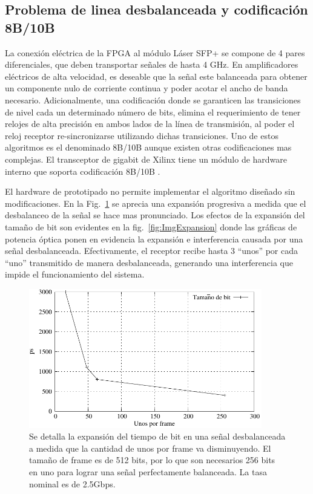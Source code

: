 \subsection{Problema de linea desbalanceada y codificación 8B/10B}
La conexión eléctrica de la FPGA al módulo Láser SFP+ se compone de 4 pares diferenciales, que deben transportar señales de hasta 4 GHz. En amplificadores eléctricos de alta velocidad, es deseable que la señal este balanceada para obtener un componente nulo de corriente continua y poder acotar el ancho de banda necesario. Adicionalmente, una codificación donde se garanticen las transiciones de nivel cada un determinado número de bits, elimina el requerimiento de tener relojes de alta precisión en ambos lados de la línea de transmisión, al poder el reloj receptor re-sincronizarse utilizando dichas transiciones.
Uno de estos algoritmos es el denominado 8B/10B aunque existen otras codificaciones mas complejas. El transceptor de gigabit de Xilinx tiene un módulo de hardware interno que soporta codificación 8B/10B .

El hardware de prototipado no permite implementar el algoritmo diseñado sin modificaciones. En la Fig.~\ref{fig:expansionbit} se aprecia una expansión progresiva a medida que el desbalanceo de la señal se hace mas pronunciado. Los efectos de la expansión del tamaño de bit son evidentes en la fig.~\ref{fig:ImgExpansion} donde las gráficas de potencia óptica ponen en evidencia la expansión e interferencia causada por una señal desbalanceada.
Efectivamente, el receptor recibe hasta 3 ``unos'' por cada ``uno'' transmitido de manera desbalanceada, generando una interferencia que impide el funcionamiento del sistema.

\begin{figure}[t]
  \centering
    \includegraphics[width=4in]{graphs/expansionbit.pdf}
\caption {Se detalla la expansión del tiempo de bit en una señal desbalanceada a medida que la cantidad de unos por frame va disminuyendo. El tamaño de frame es de 512 bits, por lo que son necesarios 256 bits en uno para lograr una señal perfectamente balanceada. La tasa nominal es de 2.5Gbps.}
\label{fig:expansionbit}
\end{figure}

